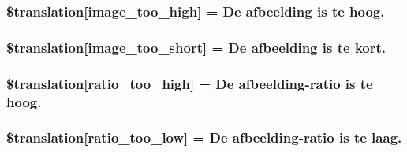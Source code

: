 \subsubsection[{\$translation}]{\setlength{\rightskip}{0pt plus 5cm}\$translation\mbox{[}\textquotesingle{}image\+\_\+too\+\_\+high\textquotesingle{}\mbox{]} = \textquotesingle{}De afbeelding is te hoog.\textquotesingle{}}\label{class_8upload_8nl___n_l_8php_aa27bde361343f3b63c7cd441860024f8}
\hypertarget{class_8upload_8nl___n_l_8php_a86fcd4e1157b00032df451188d735527}{}
\subsubsection[{\$translation}]{\setlength{\rightskip}{0pt plus 5cm}\$translation\mbox{[}\textquotesingle{}image\+\_\+too\+\_\+short\textquotesingle{}\mbox{]} = \textquotesingle{}De afbeelding is te kort.\textquotesingle{}}\label{class_8upload_8nl___n_l_8php_a86fcd4e1157b00032df451188d735527}
\hypertarget{class_8upload_8nl___n_l_8php_a23396f6ce7f31e5e5f1b57580621d982}{}
\subsubsection[{\$translation}]{\setlength{\rightskip}{0pt plus 5cm}\$translation\mbox{[}\textquotesingle{}ratio\+\_\+too\+\_\+high\textquotesingle{}\mbox{]} = \textquotesingle{}De afbeelding-\/ratio is te hoog.\textquotesingle{}}\label{class_8upload_8nl___n_l_8php_a23396f6ce7f31e5e5f1b57580621d982}
\hypertarget{class_8upload_8nl___n_l_8php_ac533b9a479f056b0b8623e4268f068c2}{}
\subsubsection[{\$translation}]{\setlength{\rightskip}{0pt plus 5cm}\$translation\mbox{[}\textquotesingle{}ratio\+\_\+too\+\_\+low\textquotesingle{}\mbox{]} = \textquotesingle{}De afbeelding-\/ratio is te laag.\textquotesingle{}}\label{class_8upload_8nl___n_l_8php_ac533b9a479f056b0b8623e4268f068c2}
\hypertarget{class_8upload_8nl___n_l_8php_aa4051ef64e94a3f8295c63cf85544016}{}
